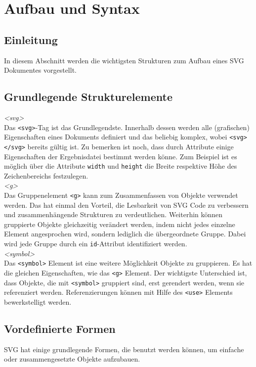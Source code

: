 \section{Aufbau und Syntax}
\subsection{Einleitung}
In diesem Abschnitt werden die wichtigsten Strukturen zum Aufbau eines SVG Dokumentes vorgestellt.
\subsection{Grundlegende Strukturelemente}
\emph{<svg>}\\
 Das \texttt{<svg>}-Tag ist das Grundlegendste. Innerhalb dessen werden alle (grafischen) Eigenschaften eines Dokuments definiert und das beliebig komplex, wobei \texttt{<svg> </svg>} bereits gültig ist. Zu bemerken ist noch, dass durch Attribute einige Eigenschaften der Ergebnisdatei bestimmt werden könne. Zum Beispiel ist es möglich über die Attribute \texttt{width} und \texttt{height} die Breite respektive Höhe des Zeichenbereichs festzulegen.\\
 
\emph{<g>}\\
 Das Gruppenelement \texttt{<g>} kann zum Zusammenfassen von Objekte verwendet werden. Das hat einmal den Vorteil, die Lesbarkeit von SVG Code zu verbessern und zusammenhängende Strukturen zu verdeutlichen. Weiterhin können gruppierte Objekte gleichzeitig verändert werden, indem nicht jedes einzelne Element angesprochen wird, sondern lediglich die übergeordnete Gruppe. Dabei wird jede Gruppe durch ein \texttt{id}-Attribut identifiziert werden.\\
 
\emph{<symbol>}\\
 Das \texttt{<symbol>} Element ist eine weitere Möglichkeit Objekte zu gruppieren. Es hat die gleichen Eigenschaften, wie das \texttt{<g>} Element. Der wichtigste Unterschied ist, dass Objekte, die mit \texttt{<symbol>} gruppiert sind, erst gerendert werden, wenn sie referenziert werden. Referenzierungen können mit Hilfe des \texttt{<use>} Elements bewerkstelligt werden.
 
 \subsection{Vordefinierte Formen}\label{basic_shapes}
 SVG hat einige grundlegende Formen, die benutzt werden können, um einfache oder zusammengesetzte Objekte aufzubauen.\\
 
